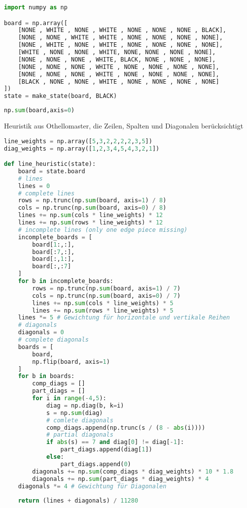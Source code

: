 \begin{lstlisting}[language=Python]
import numpy as np

board = np.array([
    [NONE , WHITE , NONE , WHITE , NONE , NONE , NONE , BLACK],
    [NONE , NONE , WHITE , WHITE , NONE , NONE , NONE , NONE],
    [NONE , WHITE , NONE , WHITE , NONE , NONE , NONE , NONE],
    [WHITE , NONE , NONE , WHITE, NONE, NONE , NONE , NONE],
    [NONE , NONE , NONE , WHITE, BLACK, NONE , NONE , NONE],
    [NONE , NONE , NONE , WHITE , NONE , NONE , NONE , NONE],
    [NONE , NONE , NONE , WHITE , NONE , NONE , NONE , NONE],
    [BLACK , NONE , NONE , WHITE , NONE , NONE , NONE , NONE]
])
state = make_state(board, BLACK)
\end{lstlisting}

\begin{lstlisting}[language=Python]
np.sum(board,axis=0)
\end{lstlisting}

Heuristik aus Othellomaster, die Zeilen, Spalten und Diagonalen
berücksichtigt

\begin{lstlisting}[language=Python]
line_weights = np.array([5,3,2,2,2,2,3,5])
diag_weights = np.array([1,2,3,4,5,4,3,2,1])

def line_heuristic(state):
    board = state.board
    # lines
    lines = 0
    # complete lines
    rows = np.trunc(np.sum(board, axis=1) / 8)
    cols = np.trunc(np.sum(board, axis=0) / 8)
    lines += np.sum(cols * line_weights) * 12
    lines += np.sum(rows * line_weights) * 12
    # incomplete lines (only one edge piece missing)
    incomplete_boards = [
        board[1:,:],
        board[:7,:],
        board[:,1:],
        board[:,:7]
    ]
    for b in incomplete_boards:
        rows = np.trunc(np.sum(board, axis=1) / 7)
        cols = np.trunc(np.sum(board, axis=0) / 7)
        lines += np.sum(cols * line_weights) * 5
        lines += np.sum(rows * line_weights) * 5
    lines *= 5 # Gewichtung für horizontale und vertikale Reihen
    # diagonals
    diagonals = 0
    # complete diagonals
    boards = [
        board,
        np.flip(board, axis=1)
    ]
    for b in boards:
        comp_diags = []
        part_diags = []
        for i in range(-4,5):
            diag = np.diag(b, k=i)
            s = np.sum(diag)
            # comlete diagonals
            comp_diags.append(np.trunc(s / (8 - abs(i))))
            # partial diagonals
            if abs(s) == 7 and diag[0] != diag[-1]:
                part_diags.append(diag[1])
            else:
                part_diags.append(0)
        diagonals += np.sum(comp_diags * diag_weights) * 10 * 1.8
        diagonals += np.sum(part_diags * diag_weights) * 4
    diagonals *= 4 # Gewichtung für Diagonalen
    
    return (lines + diagonals) / 11280
\end{lstlisting}

